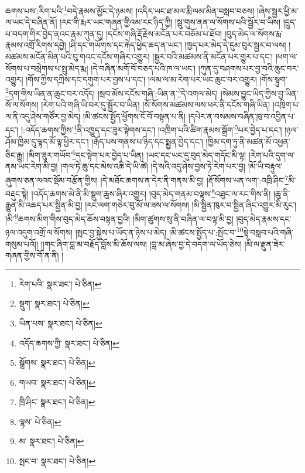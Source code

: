 ཆགས་པས་:རིག་པའི་\footnote{རེག་པའི་  སྣར་ཐང་།  པེ་ཅིན། }བདེ་རྣམས་མྱོང་དེ་ཉམས། །འདིར་ཡང་ཐ་མལ་རྨི་ལམ་མིན་བསླབ་བཅས། །ཞེས་སྦྱར་ཕྱི་མ་ལ་ཡང་དེ་བཞིན་ནོ། །རང་གི་རྨར་ཡང་གཞན་གྱིའམ་རང་ཉིད་ཀྱི། །སྦུ་གུས་ནན་ལ་སོགས་པའི་སྦྱོར་བ་ཡིས། །དྲུད་པ་བདག་གིར་བྱེད་ནའང་རྣམ་ཀུན་དུ། །དངོས་གཞི་རྡོ་རྗེས་མངོན་པར་བཅོམ་པ་ཐོབ། །བུད་མེད་ལ་སོགས་རྨ་རྣམས་འགྲོ་རིགས་དབྱེ། །ཤི་དང་གཡོགས་དང་རྐེད་ཕྱེད་ཆད་ན་ཡང་། །ཁྱད་པར་མེད་དེ་དུམ་བུར་སྦྱར་བ་ལས། །མཚམས་མངོན་མིན་པའི་བུ་གའང་དངོས་གཞིར་འགྱུར། །སྦྱར་བའི་མཚམས་ནི་མངོན་པར་གྱུར་པ་དང་། །ཕག་ལ་སོགས་པ་བསྲེགས་པ་སྤུ་མེད་རྨ། །དེ་བཞིན་མགོ་བོ་བཅད་པའི་ཁ་ལ་ཡང་། །ཀུན་དུ་བཤགས་པར་བྱ་བའི་ཆུང་བར་འགྱུར། །གོས་ཀྱིས་དཀྲིས་དང་དགུག་པར་བྱས་པ་དང་། །ལམ་ལ་མ་རེག་པར་ཡང་ཆུང་བར་འགྱུར། །གོས་སྟུག་\footnote{སྡུག་  སྣར་ཐང་།  པེ་ཅིན། }དག་གིས་ཡིན་ན་ཆུང་བར་འདོད། །སྲབ་མོས་དངོས་གཞི་:ཡིན་ན་\footnote{ཡིན་པས་  སྣར་ཐང་།  པེ་ཅིན། }དེ་འགལ་མེད། །སེམས་བྱུང་ཡིད་ཀྱིས་བྱ་ཡིན་སོ་ལ་སོགས། །རེག་པའི་གཞི་ཡི་བར་དུ་སྦྱོར་བ་ཡིན། །སོ་སོགས་མཚམས་ལས་ཕར་ནི་དངོས་གཞི་ཡིན། །འཁྲིག་པ་ལ་ནི་འདུ་ཤེས་གཙོར་བྱ་མེད། །མི་ཚངས་སྤྱོད་ཕྱོགས་ངོ་བོ་བསྟན་པ་ནི། །དཔེར་ན་བསམས་བཞིན་ཁུ་བ་འབྱིན་པ་དང་། །:འདོད་ཆགས་ཀྱིས་\footnote{འདོད་ཆགས་ཀྱི་  སྣར་ཐང་།  པེ་ཅིན། }ནི་འཁྱུད་དང་ཟུར་སྟེགས་དང་། །འཁྲིག་པའི་ཚིག་རྣམས་སྒྲོག་\footnote{སྒྲོགས་  སྣར་ཐང་།  པེ་ཅིན། }པར་བྱེད་པ་དང་། །ཉལ་ཤོམ་ཁྱིམ་དུ་ལྟད་མོ་ལྟ་ཕྱིར་དང་། །རྒོད་པས་གནས་པ་ཉིད་དང་སྨྱན་བྱེད་དང་། །ཁྱིམ་དག་ཏུ་ནི་མཚན་མོ་འཕྱན་ཅིང་རྒྱུ། །མིག་ཟུར་གཡོབ་\footnote{གཡབ་  སྣར་ཐང་།  པེ་ཅིན། }དང་སྟེག་པར་བྱེད་པ་ཡིན། །ཡང་དང་ཡང་དུ་བུད་མེད་གདོང་མི་ལྟ། །རེག་པའི་དུག་ལ་ནམ་ཡང་རེག་མི་བྱ། །གལ་ཏེ་ཆུ་དང་མེས་འཆི་དེ་ཡི་ཚེ། །དེ་སའི་འདུ་ཤེས་བྱས་ཏེ་རེག་པར་བྱ། །མོ་ཡི་བརྟུལ་ཞུགས་ཅན་ལའང་སྡོམ་བརྩོན་གྱིས། །དེ་མཐོང་ཆགས་ན་དེར་ནི་གནས་མི་བྱ། །རྡོ་སོགས་ཡན་ལག་:འཁྲི་ཤིང་\footnote{ཁྲི་ཤིང་  སྣར་ཐང་།  པེ་ཅིན། }མི་བརྡུང་སྟེ། །འདོད་ཆགས་མེ་ནི་མི་སྡུག་ཆུས་ཞིར་འགྱུར། །བུད་མེད་གནམ་བལྟས་\footnote{ལྷས་  པེ་ཅིན། }འཐུང་ལ་རང་གིས་ནི། །ཆུ་ནི་རྒྱུན་མི་འཆད་པར་སྦྱིན་མི་བྱ། །རང་ལག་གཅེར་བུ་མོ་ལ་ཟས་ལ་སོགས། །མི་སྦྱིན་ཁུར་བ་སྦྱིན་ཞིང་འགྱུར་མི་རུང་། །མི་\footnote{མ་  སྣར་ཐང་།  པེ་ཅིན། }ཆགས་མིག་གིས་བུད་མེད་ཆོས་བསྟན་བྱའི། །མིག་ཚུགས་སུ་ནི་བཞིན་ལ་བལྟ་མི་བྱ། །བུད་མེད་རྣམས་དང་ཉལ་འདུག་འགྲོ་ལ་སོགས། །སྤང་བྱ་སྐྱེས་པ་ཡོད་ན་ཉེས་པ་མེད། །མི་ཚངས་སྤྱོད་པ་:སྤོང་བ་\footnote{སྤང་བ་  སྣར་ཐང་།  པེ་ཅིན། }སྟེ་བསླབ་པའི་གཞི་གསུམ་པའོ།། །།གང་ཞིག་བླ་མ་བརྗོད་བློས་མི་ཆོས་ལས། །བླ་མ་ཞེས་བྱ་དེ་བདག་ལ་ཡོད་ཅེས། །མི་ལ་རྫུན་ཟེར་གཞན་གྱིས་གོ་ན་ནི། །
